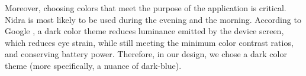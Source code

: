 Moreover, choosing colors that meet the purpose of the application is critical. Nidra is most likely to be used during the evening and the morning. According to Google \cite{darktheme}, a dark color theme reduces luminance emitted by the device screen, which reduces eye strain, while still meeting the minimum color contrast ratios, and conserving battery power. Therefore, in our design, we chose a dark color theme (more specifically, a nuance of dark-blue). 
